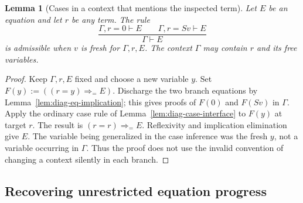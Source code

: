 \documentclass[11pt]{article}
\newtheorem{lemma}[theorem]{Lemma}
\theoremstyle{definition}
\theoremstyle{remark}
\begin{document}
\begin{lemma}[Cases in a context that mentions the inspected term]
\label{lem:diag-dependent-cases}
Let $E$ be an equation and let $r$ be any term.  The rule
\[
 \frac{\Gamma,r=0\vdash E\qquad\Gamma,r=Sv\vdash E}
      {\Gamma\vdash E}
\]
is admissible when $v$ is fresh for $\Gamma,r,E$.
The context $\Gamma$ may contain $r$ and its free variables.
\end{lemma}
\begin{proof}
Keep $\Gamma,r,E$ fixed and choose a new variable $y$.
Set $F(y):=((r=y)\Rightarrow_{=}E)$.
Discharge the two branch equations by
Lemma~\ref{lem:diag-eq-implication}; this gives proofs of $F(0)$ and
$F(Sv)$ in $\Gamma$.  Apply the ordinary case rule of
Lemma~\ref{lem:diag-case-interface} to $F(y)$ at target $r$.
The result is $(r=r)\Rightarrow_{=}E$.
Reflexivity and implication elimination give $E$.
The variable being generalized in the case inference was the fresh
$y$, not a variable occurring in $\Gamma$.  Thus the proof does not
use the invalid convention of changing a context silently in each branch.
\end{proof}

\subsection{Recovering unrestricted equation progress}
\end{document}
